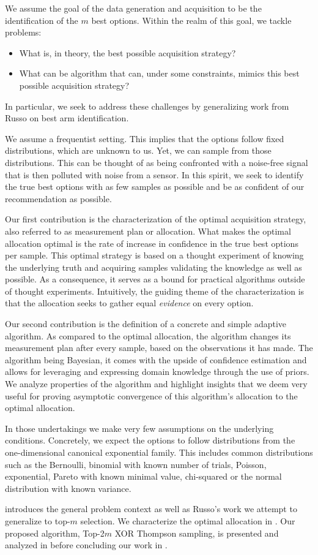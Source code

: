 We assume the goal of the data generation and acquisition to be the identification of the $m$ best options. Within the realm of this goal, we tackle problems:
\begin{itemize}
  \item What is, in theory, the best possible acquisition strategy?
  \item What can be algorithm that can, under some constraints, mimics this best possible acquisition strategy?
\end{itemize}
In particular, we seek to address these challenges by generalizing work from Russo \cite{DBLP:journals/corr/Russo16} on best arm identification.

We assume a frequentist setting. This implies that the options follow fixed distributions, which are unknown to us. Yet, we can sample from those distributions. This can be thought of as being confronted with a noise-free signal that is then polluted with noise from a sensor. In this spirit, we seek to identify the true best options with as few samples as possible and be as confident of our recommendation as possible.

Our first contribution is the characterization of the optimal acquisition strategy, also referred to as measurement plan or allocation. What makes the optimal allocation optimal is the rate of increase in confidence in the true best options per sample. This optimal strategy is based on a thought experiment of knowing the underlying truth and acquiring samples validating the knowledge as well as possible. As a consequence, it serves as a bound for practical algorithms outside of thought experiments. Intuitively, the guiding theme of the characterization is that the allocation seeks to gather equal \emph{evidence} on every option.

Our second contribution is the definition of a concrete and simple adaptive algorithm. As compared to the optimal allocation, the algorithm changes its measurement plan after every sample, based on the observations it has made. The algorithm being Bayesian, it comes with the upside of confidence estimation and allows for leveraging and expressing domain knowledge through the use of priors. We analyze properties of the algorithm and highlight insights that we deem very useful for proving asymptotic convergence of this algorithm's allocation to the optimal allocation.

In those undertakings we make very few assumptions on the underlying conditions. Concretely, we expect the options to follow distributions from the
one-dimensional canonical exponential family. This includes common distributions such as the Bernoulli, binomial with known number of trials, Poisson, exponential, Pareto with known minimal value, chi-squared or the normal distribution with known variance.

 introduces the general problem context as well as Russo's work we attempt to generalize to top-$m$ selection. We characterize the optimal allocation in . Our proposed algorithm, Top-2$m$ XOR Thompson sampling, is presented and analyzed in  before concluding our work in .
